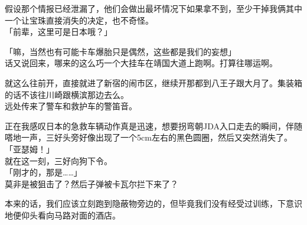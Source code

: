 假设那个情报已经泄漏了，他们会做出最坏情况下如果拿不到，至少干掉我俩其中一个让宝珠直接消失的决定，也不奇怪。\\

「前辈，这里可是日本哦？」

「嘛，当然也有可能卡车爆胎只是偶然，这些都是我们的妄想」\\

话又说回来，哪来的这么巧一个大挂车在靖国大道上跑啊。打算往哪运啊。

就这么往前开，直接就进了新宿的闹市区，继续开那都到八王子跟大月了。集装箱的话不该往川崎跟横滨那边去么。\\

远处传来了警车和救护车的警笛音。

正在我感叹日本的急救车辆动作真是迅速，想要拐弯朝JDA入口走去的瞬间，伴随嗒地一声，三好头旁好像出现了一个5cm左右的黑色圆圈，然后又突然消失了。\\

「亚瑟姆！」\\

就在这一刻，三好向狗下令。\\

「刚才的，那是……」\\

莫非是被狙击了？然后子弹被卡瓦尔拦下来了？

本来的话，我们应该立刻跑到隐蔽物旁边的，但毕竟我们没有经受过训练，下意识地便仰头看向马路对面的酒店。\\

